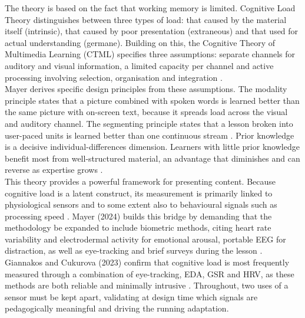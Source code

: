 \documentclass[runningheads]{llncs}
\begin{document}
The theory is based on the fact that working memory is limited. Cognitive Load Theory distinguishes between three types of load: that caused by the material itself (intrinsic), that caused by poor presentation (extraneous) and that used for actual understanding (germane). Building on this, the Cognitive Theory of Multimedia Learning (CTML) specifies three assumptions: separate channels for auditory and visual information, a limited capacity per channel and active processing involving selection, organisation and integration \cite{mayer_past_2024}.\\
Mayer derives specific design principles from these assumptions. The modality principle states that a picture combined with spoken words is learned better than the same picture with on-screen text, because it spreads load across the visual and auditory channel. The segmenting principle states that a lesson broken into user-paced units is learned better than one continuous stream \cite{mayer_past_2024}.
Prior knowledge is a decisive individual-differences dimension. Learners with little prior knowledge benefit most from well-structured material, an advantage that diminishes and can reverse as expertise grows \cite{kalyuga_expertise_2007}. \\
This theory provides a powerful framework for presenting content. Because cognitive load is a latent construct, its measurement is primarily linked to physiological sensors and to some extent also to behavioural signals such as processing speed \cite{youssef_when_2025}. Mayer (2024) builds this bridge by demanding that the methodology be expanded to include biometric methods, citing heart rate variability and electrodermal activity for emotional arousal, portable EEG for distraction, as well as eye-tracking and brief surveys during the lesson \cite{mayer_past_2024}. Giannakos and Cukurova (2023) confirm that cognitive load is most frequently measured through a combination of eye-tracking, EDA, GSR and HRV, as these methods are both reliable and minimally intrusive \cite{giannakos_role_2023}.
Throughout, two uses of a sensor must be kept apart, validating at design time which signals are pedagogically meaningful and driving the running adaptation.
\end{document}
